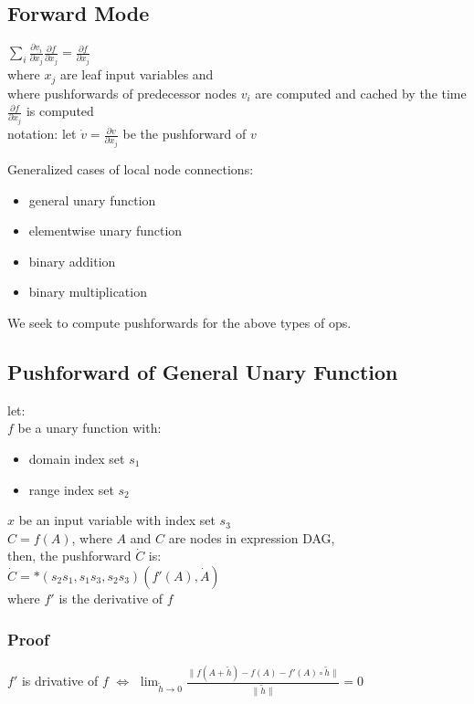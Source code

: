 \documentclass[8pt]{extarticle}
\begin{document}
\begin{multicols*}{2}
  \vfill\null
  \columnbreak
    
  \section{Forward Mode}
  $\sum_{i} \frac{ \partial v_i}{\partial x_j} \frac{\partial f}{\partial x_j} = \frac{\partial f}{\partial x_j}$\\
  where $x_j$ are leaf input variables and\\
  where pushforwards of predecessor nodes $v_i$ are computed and cached by the time $\frac{\partial f}{\partial x_j}$ is computed\\
  
  notation: let $\dot{v} = \frac{\partial v}{\partial x_j}$ be the pushforward of $v$

  Generalized cases of local node connections:
  \begin{itemize}
  \item general unary function
  \item elementwise unary function
  \item binary addition
  \item binary multiplication
  \end{itemize}

  We seek to compute pushforwards for the above types of ops.

  \vfill\null
  \columnbreak
    
  \subsection{Pushforward of General Unary Function}
  let:\\
  $f$ be a unary function with:
  \begin{itemize}
  \item domain index set $s_1$
  \item range index set $s_2$
  \end{itemize}
  $x$ be an input variable with index set $s_3$\\
  $C=f(A)$, where $A$  and $C$ are nodes in expression DAG,\\
  then, the pushforward $\dot{C}$ is:\\
  $\dot{C} = *(s_2 s_1, s_1 s_3, s_2 s_3)( f'(A), \dot{A})$\\
  where $f'$ is the derivative of $f$

  \subsubsection{Proof}
  $f'$ is drivative of $f$ $\iff$ $\lim_{\tilde{h} \rightarrow 0} \frac{\| f(A+\tilde{h}) - f(A) - f'(A) \circ \tilde{h} \|}{\| \tilde{h} \|} = 0$\\


\end{multicols*}
\end{document}
